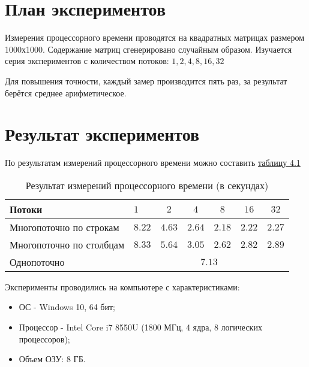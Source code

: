\section{План экспериментов}
Измерения процессорного времени проводятся на квадратных матрицах размером 1000х1000. Содержание матриц сгенерировано случайным образом. Изучается серия экспериментов с количеством потоков: $1, 2, 4, 8, 16, 32$

Для повышения точности, каждый замер производится пять раз, за результат берётся среднее арифметическое.

\section{Результат экспериментов}
По результатам измерений процессорного времени можно составить \hyperref[table_4_1]{таблицу 4.1}

\begin{table}[h] \label{table_4_1}
\caption{Результат измерений процессорного времени (в секундах)}
\begin{tabular}{| p{5.0cm} | l | c | c | c | c | c |}
	\hline
	Потоки						&$1$	&$2$	&$4$	&$8$	&$16$	&$32$	\\
	\hline\hline
	Многопоточно по строкам		&$8.22$	&$4.63$	&$2.64$	&$2.18$	&$2.22$	&$2.27$	\\
	\hline
	Многопоточно по столбцам	&$8.33$	&$5.64$	&$3.05$	&$2.62$	&$2.82$	&$2.89$	\\
	\hline
	Однопоточно					&\multicolumn{6}{|c|}{$7.13$}					\\
	\hline
\end{tabular}
\end{table}

Эксперименты проводились на компьютере с характеристиками:
\begin{itemize}
	\item ОС - Windows 10, 64 бит;
	\item Процессор -  Intel Core i7 8550U (1800 МГц, 4 ядра, 8 логических процессоров);
	\item Объем ОЗУ: 8 ГБ.
\end{itemize}


